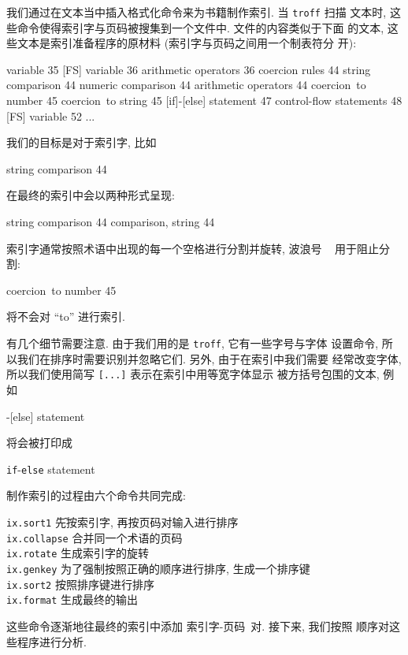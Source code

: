 我们通过在文本当中插入格式化命令来为书籍制作索引. 当 \texttt{troff} 扫描 
文本时, 这些命令使得索引字与页码被搜集到一个文件中. 文件的内容类似于下面
的文本, 这些文本是索引准备程序的原材料 (索引字与页码之间用一个制表符分
开):
%
\begin{file}
    [FS] variable	35
    [FS] variable	36
    arithmetic operators	36
    coercion rules	44
    string comparison	44
    numeric comparison	44
    arithmetic operators	44
    coercion~to number	45
    coercion~to string	45
    [if]-[else] statement	47
    control-flow statements	48
    [FS] variable	52
    ...
\end{file}
我们的目标是对于索引字, 比如 
\begin{file}
    string comparison       44
\end{file}
在最终的索引中会以两种形式呈现:
\begin{file}
    string comparison 44
    comparison, string 44
\end{file}
索引字通常按照术语中出现的每一个空格进行分割并旋转, 波浪号 \texttt{~}
用于阻止分割:
\begin{file}
    coercion~to number      45
\end{file}
将不会对 ``to'' 进行索引.

有几个细节需要注意. 由于我们用的是 \texttt{troff}, 它有一些字号与字体
设置命令, 所以我们在排序时需要识别并忽略它们. 另外, 由于在索引中我们需要
经常改变字体, 所以我们使用简写 \texttt{[...]} 表示在索引中用等宽字体显示
被方括号包围的文本, 例如 
\begin{file}
    [if]-[else] statement
\end{file}
将会被打印成
\begin{pattern}
    \texttt{if}-\texttt{else} statement
\end{pattern}

制作索引的过程由六个命令共同完成:
\begin{tabbing}
\texttt{ix.sort1} \hspace{10em} \= 先按索引字, 再按页码对输入进行排序 \\
\texttt{ix.collapse}    \> 合并同一个术语的页码 \\
\texttt{ix.rotate}  \> 生成索引字的旋转 \\
\texttt{ix.genkey}  \> 为了强制按照正确的顺序进行排序, 生成一个排序键 \\
\texttt{ix.sort2}   \> 按照排序键进行排序 \\
\texttt{ix.format}  \> 生成最终的输出
\end{tabbing}
这些命令逐渐地往最终的索引中添加 \mbox{索引字}-页码\ 对. 接下来, 我们按照
顺序对这些程序进行分析.

